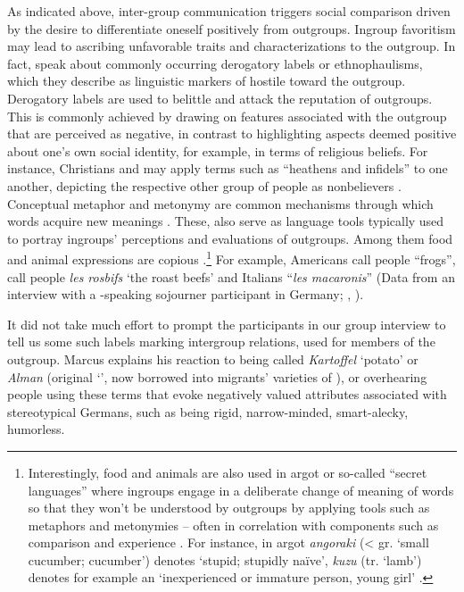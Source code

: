 \documentclass[output=paper,colorlinks,citecolor=brown]{langscibook}
\begin{document}
\begin{sloppypar}
As indicated above, inter-group communication triggers social comparison driven by the desire to differentiate oneself positively from outgroups. Ingroup favoritism may lead to ascribing unfavorable traits and characterizations to the outgroup. In fact, \citet{keblusek_giles_maass2017} speak about commonly occurring derogatory labels or ethnophaulisms, which they describe as linguistic markers of hostile  toward the outgroup. Derogatory labels are used to belittle and attack the reputation of outgroups. This is commonly achieved by drawing on features associated with the outgroup that are perceived as negative, in contrast to highlighting aspects deemed positive about one's own social identity, for example, in terms of religious beliefs. For instance, Christians and  may apply terms such as ``heathens and infidels'' to one another, depicting the respective other group of people as nonbelievers \citep[637]{keblusek_giles_maass2017}. Conceptual metaphor and metonymy are common mechanisms through which words acquire new meanings \citep{murphy2010}. These, also serve as language tools typically used to portray ingroups' perceptions and evaluations of outgroups. Among them food and animal expressions are copious \citep{keblusek_giles_maass2017,haslam_holland_stratemeyer2016}.\footnote{%
Interestingly, food and animals are also used in argot or so-called ``secret languages'' where ingroups engage in a deliberate change of meaning of words so that they won't be understood by outgroups by applying tools such as metaphors and metonymies -- often in correlation with components such as comparison and experience \citep{petrou2020}. For instance, in  argot \textit{angoraki} (< gr. `small cucumber; cucumber') denotes `stupid; stupidly naïve', \textit{kuzu} (tr. `lamb') denotes for example an `inexperienced or immature person, young girl' \citep{petrou2020}.} For example, Americans call  people ``frogs'',  call  people \textit{les rosbifs} `the roast beefs' and Italians ``\textit{les macaronis}'' (Data from an interview with a -speaking sojourner participant in Germany; \citeauthor{petrou2023}, \citeyear{petrou2023}). 
\end{sloppypar}
 
It did not take much effort to prompt the participants in our group interview to tell us some such labels marking intergroup relations, used for members of the outgroup. Marcus explains his reaction to being called \textit{Kartoffel} `potato' or \textit{Alman} (original  `', now borrowed into migrants' varieties of ), or overhearing people using these terms that evoke negatively valued attributes associated with stereotypical Germans, such as being rigid, narrow-minded, smart-alecky, humorless.
\end{document}
